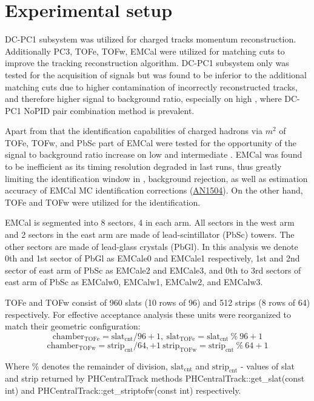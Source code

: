 \section{Experimental setup}

DC-PC1 subsystem was utilized for charged tracks momentum reconstruction. 
Additionally PC3, TOFe, TOFw, EMCal were utilized for matching cuts to improve the tracking reconstruction algorithm. 
DC-PC1 subsystem only was tested for the acquisition of \Kstar signals but was found to be inferior to the additional matching cuts due to higher contamination of incorrectly reconstructed tracks, and therefore higher signal to background ratio, especially on high \pt, where DC-PC1 NoPID pair combination method is prevalent.

Apart from that the identification capabilities of charged hadrons via $m^2$ of TOFe, TOFw, and PbSc part of EMCal were tested for the opportunity of the signal to background ratio increase on low and intermediate \pt. 
EMCal was found to be inefficient as its timing resolution degraded in last runs, thus greatly limiting the identification window in \pt, background rejection, as well as estimation accuracy of EMCal MC identification corrections (\href{https://phenix-intra.sdcc.bnl.gov/phenix/WWW/p/draft/berd/Sergei/AN_AuAu_KStar.pdf}{AN1504}). 
On the other hand, TOFe and TOFw were utilized for the identification.

EMCal is segmented into 8 sectors, 4 in each arm. 
All sectors in the west arm and 2 sectors in the east arm are made of lead-scintillator (PbSc) towers. The other sectors are made of lead-glass crystals (PbGl). 
In this analysis we denote 0th and 1st sector of PbGl as EMCale0 and EMCale1 respectively, 1st and 2nd sector of east arm of PbSc as EMCale2 and EMCale3, and 0th to 3rd sectors of east arm of PbSc as EMCalw0, EMCalw1, EMCalw2, and EMCalw3.

TOFe and TOFw consist of 960 slats (10 rows of 96) and 512 strips (8 rows of 64) respectively. For effective acceptance analysis these units were reorganized to match their geometric configuration: 
\begin{equation}
\text{chamber}_{\text{TOFe}} = \text{slat}_{\text{cnt}}/96 + 1, \ \text{slat}_{\text{TOFe}} = \text{slat}_{\text{cnt}} \ \% \ 96 + 1
\end{equation}
\begin{equation}
\text{chamber}_{\text{TOFw}} = \text{strip}_{\text{cnt}}/64, + 1 \ \text{strip}_{\text{TOFw}} = \text{strip}_{\text{cnt}} \ \% \ 64 + 1
\end{equation}

Where $\%$ denotes the remainder of division, $\text{slat}_{\text{cnt}}$ and $\text{strip}_{\text{cnt}}$ - values of slat and strip returned by PHCentralTrack methods PHCentralTrack::get\_slat(const int) and PHCentralTrack::get\_striptofw(const int) respectively.
